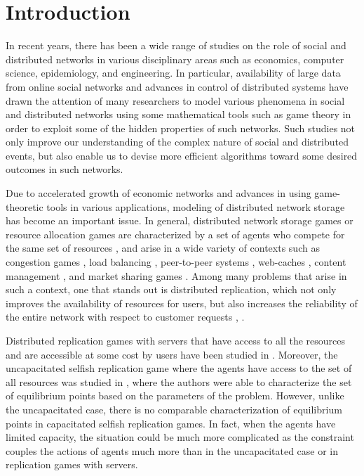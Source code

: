 \section{Introduction}
In recent years, there has been a wide range of studies on the role of social and distributed networks in various disciplinary areas such as economics, computer science, epidemiology, and engineering. In particular, availability of large data from online social networks and advances in control of distributed systems have drawn the attention of many researchers to model various phenomena in social and distributed networks using some mathematical tools such as game theory in order to exploit some of the hidden properties of such networks. Such studies not only improve our understanding of the complex nature of social and distributed events, but also enable us to devise more efficient algorithms toward some desired outcomes in such networks.

Due to accelerated growth of economic networks and advances in using game-theoretic tools in various applications, modeling of distributed network storage has become an important issue. In general, distributed network storage games or resource allocation games are characterized by a set of agents who compete for the same set of resources \cite{pacifici2012convergence,masucci2014strategic}, and arise in a wide variety of contexts such as congestion games \cite{milchtaich1996congestion,ackermann2008impact,fabrikant2004complexity}, load balancing \cite{ghosh1994dynamic}, peer-to-peer systems \cite{pollatos2008social}, web-caches \cite{gopalakrishnan2012cache}, content management \cite{pollatos2008social}, and market sharing games \cite{goemans2006market}. Among many problems that arise in such a context, one that stands out is distributed replication, which not only improves the availability of resources for users, but also increases the reliability of the entire network with respect to customer requests \cite{chun2004selfish}, \cite{goyal2000learning}.

Distributed replication games with servers that have access to all the resources and are accessible at some cost by users have been studied in \cite{laoutaris2006distributed}. Moreover, the uncapacitated selfish replication game where the agents have access to the set of all resources was studied in \cite{chun2004selfish}, where the authors were able to characterize the set of equilibrium points based on the parameters of the problem. However, unlike the uncapacitated case, there is no comparable characterization of equilibrium points in capacitated selfish replication games. In fact, when the agents have limited capacity, the situation could be much more complicated as the constraint couples the actions of agents much more than in the uncapacitated case or in replication games with servers.

